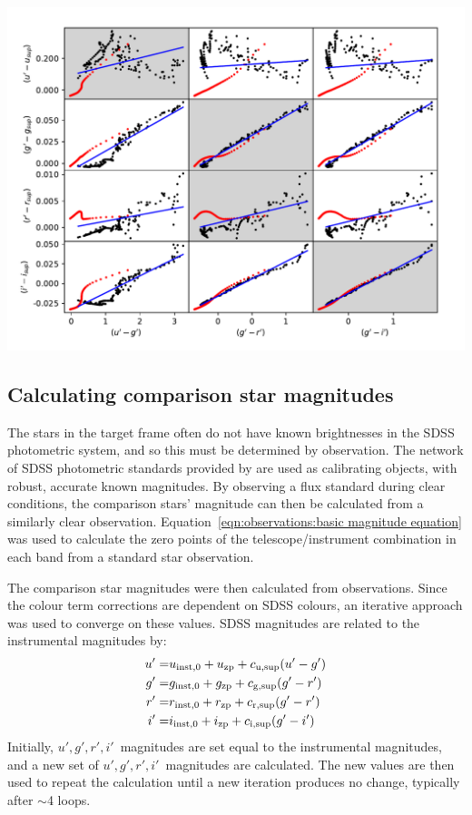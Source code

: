 \begin{minipage}{\linewidth}
    \includegraphics[width=\textwidth]{figures/observations/colour_term_tracks_HCAM.pdf}
    \label{fig:observations:HiPERCAM colour corrections}
\end{minipage}


\subsection{Calculating comparison star magnitudes}
\label{sect:comparison star mag calc}

The stars in the target frame often do not have known brightnesses in the SDSS photometric system, and so this must be determined by observation. The network of SDSS photometric standards provided by \citet{smith2002} are used as calibrating objects, with robust, accurate known magnitudes. By observing a flux standard during clear conditions, the comparison stars' magnitude can then be calculated from a similarly clear observation.
Equation~\ref{eqn:observations:basic magnitude equation} was used to calculate the zero points of the telescope/instrument combination in each band from a standard star observation.

The comparison star magnitudes were then calculated from observations.
Since the colour term corrections are dependent on SDSS colours, an iterative approach was used to converge on these values.
SDSS magnitudes are related to the instrumental magnitudes by:
\begin{align*}
    u' =& u_{\rm inst,0} + u_{\rm zp} + c_{\rm u, sup}(u' - g') \\
    g' =& g_{\rm inst,0} + g_{\rm zp} + c_{\rm g, sup}(g' - r') \\
    r' =& r_{\rm inst,0} + r_{\rm zp} + c_{\rm r, sup}(g' - r') \\
    i' =& i_{\rm inst,0} + i_{\rm zp} + c_{\rm i, sup}(g' - i') \\
\end{align*}
Initially, $u',g',r',i'$\ magnitudes are set equal to the instrumental magnitudes, and a new set of $u',g',r',i'$\ magnitudes are calculated. The new values are then used to repeat the calculation until a new iteration produces no change, typically after $\sim$4 loops.


